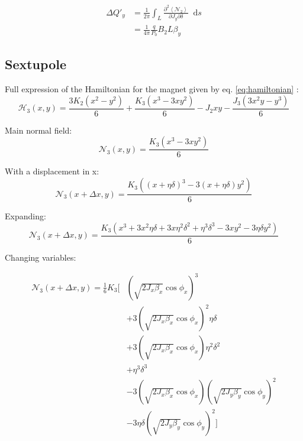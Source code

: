 \documentclass[12pt,a4,]{article}
\numberwithin{equation}{subsection}
\newcommand*\diff{\mathop{}\!\mathrm{d}}
\begin{document}
\begin{equation}\begin{aligned}
\Delta Q'_y &= \frac{1}{2\pi} \int_L \frac{\partial^2 \left< \mathcal{N_2} \right>}{\partial J_y \partial \delta} \diff s \\
  & = \frac{1}{4 \pi} \frac{q}{P_0} B_2 L \beta_y
\end{aligned}\end{equation}

\newpage

\hypertarget{sextupole-2}{%
\subsection{Sextupole}\label{sextupole-2}}

Full expression of the Hamiltonian for the magnet given by eq.
\ref{eq:hamiltonian} :
\begin{equation}\mathcal{H_3}(x, y) = \frac{3 K_{2} \left(x^{2} - y^{2}\right)}{6} + \frac{K_{3} \left(x^{3} - 3 x y^{2}\right)}{6} - J_{2} x y - \frac{J_{3} \left(3 x^{2}y - y^{3}\right)}{6}\end{equation}

Main normal field:
\begin{equation}\mathcal{N_3}(x, y) = \frac{K_{3} \left(x^{3} - 3 xy^{2}\right)}{6}\end{equation}

With a displacement in x:
\begin{equation}\mathcal{N_3}(x + \Delta x, y) = \frac{K_{3} \left((x + \eta \delta)^{3} - 3 (x + \eta \delta)y^{2}\right)}{6}\end{equation}

Expanding:
\begin{equation}\mathcal{N_3}(x + \Delta x, y) = \frac{K_{3} \left(x^3 + 3 x^2 \eta \delta + 3 x \eta^2 \delta^2 + \eta^3 \delta^3 - 3xy^2 - 3 \eta \delta y^2 \right)}{6}\end{equation}

Changing variables:

\begin{equation}\begin{aligned}
  \mathcal{N_3}(x + \Delta x, y) = \frac{1}{6} K_3 \biggl[&
       \left(\sqrt{2 J_x \beta_x} \cos \phi_x\right)^3 \\
  &    + 3 \left(\sqrt{2 J_x \beta_x} \cos \phi_x\right)^2 \eta \delta \\
  &    + 3 \left(\sqrt{2 J_x \beta_x} \cos \phi_x\right) \eta^2 \delta^2 \\
  &    + \eta^3 \delta^3 \\
  &    - 3 \left(\sqrt{2 J_x \beta_x} \cos \phi_x \right) \left(\sqrt{2 J_y \beta_y} \cos \phi_y \right)^2 \\
  &    - 3 \eta \delta (\sqrt{2 J_y \beta_y} \cos \phi_y)^2 \biggl]
\end{aligned}\end{equation}
\end{document}
